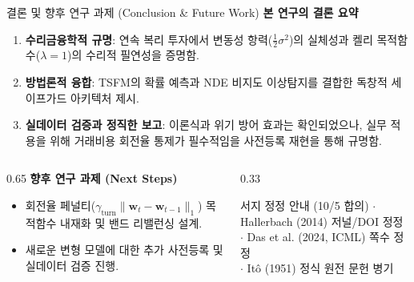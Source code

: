 \begin{frame}{결론 및 향후 연구 과제 (Conclusion \& Future Work)}
\textbf{본 연구의 결론 요약}
\begin{enumerate}
  \setlength{\itemsep}{3pt}
  \small
  \item \textbf{수리금융학적 규명}: 연속 복리 투자에서 변동성 항력($\frac{1}{2}\sigma^2$)의 실체성과 켈리 목적함수($\lambda=1$)의 수리적 필연성을 증명함.
  \item \textbf{방법론적 융합}: TSFM의 확률 예측과 NDE 비지도 이상탐지를 결합한 독창적 세이프가드 아키텍처 제시.
  \item \textbf{실데이터 검증과 정직한 보고}: 이론식과 위기 방어 효과는 확인되었으나, 실무 적용을 위해 거래비용 회전율 통제가 필수적임을 사전등록 재현을 통해 규명함.
\end{enumerate}

\vspace{2mm}
\begin{columns}[T]
  \begin{column}{0.65\textwidth}
    \textbf{향후 연구 과제 (Next Steps)}
    \begin{itemize}
      \setlength{\itemsep}{2pt}
      \scriptsize
      \item 회전율 페널티($\gamma_{\text{turn}}\|\mathbf{w}_t - \mathbf{w}_{t-1}\|_1$) 목적함수 내재화 및 밴드 리밸런싱 설계.
      \item 새로운 변형 모델에 대한 추가 사전등록 및 실데이터 검증 진행.
    \end{itemize}
  \end{column}
  
  \begin{column}{0.33\textwidth}
    \begin{exampleblock}{서지 정정 안내 (10/5 합의)}
      \tiny
      $\cdot$ Hallerbach (2014) 저널/DOI 정정\\
      $\cdot$ Das et al. (2024, ICML) 쪽수 정정\\
      $\cdot$ Itô (1951) 정식 원전 문헌 병기
    \end{exampleblock}
  \end{column}
\end{columns}
\end{frame}

